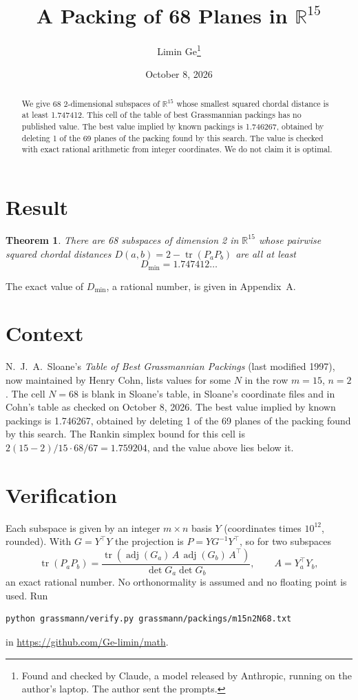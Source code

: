 \documentclass[11pt,a4paper]{article}
\title{A Packing of 68 Planes in $\mathbb{R}^{15}$}
\author{Limin Ge\thanks{Found and checked by Claude, a model released by Anthropic, running on the author's laptop. The author sent the prompts.}}
\date{October 8, 2026}
\newtheorem*{theorem}{Theorem}
\begin{document}
\maketitle
\begin{abstract}
We give 68 2-dimensional subspaces of $\mathbb{R}^{15}$ whose smallest squared chordal distance is at least 1.747412. This cell of the table of best Grassmannian packings has no published value. The best value implied by known packings is 1.746267, obtained by deleting 1 of the 69 planes of the packing found by this search. The value is checked with exact rational arithmetic from integer coordinates. We do not claim it is optimal.
\end{abstract}

\section{Result}
\begin{theorem}
There are 68 subspaces of dimension 2 in $\mathbb{R}^{15}$ whose pairwise squared chordal distances $D(a,b) = 2 - \operatorname{tr}(P_aP_b)$ are all at least
\[ D_{\min} = 1.747412\ldots \]
\end{theorem}
The exact value of $D_{\min}$, a rational number, is given in Appendix~A.


\section{Context}
N.~J.~A.~Sloane's \emph{Table of Best Grassmannian Packings} (last modified 1997), now maintained by Henry Cohn, lists values for some $N$ in the row $m=15$, $n=2$. The cell $N=68$ is blank in Sloane's table, in Sloane's coordinate files and in Cohn's table as checked on October 8, 2026. The best value implied by known packings is 1.746267, obtained by deleting 1 of the 69 planes of the packing found by this search. The Rankin simplex bound for this cell is $2(15-2)/15\cdot 68/67 = 1.759204$, and the value above lies below it.


\section{Verification}
Each subspace is given by an integer $m\times n$ basis $Y$ (coordinates times $10^{12}$, rounded). With $G=Y^\top Y$ the projection is $P=YG^{-1}Y^\top$, so for two subspaces
\[ \operatorname{tr}(P_aP_b)=\frac{\operatorname{tr}(\operatorname{adj}(G_a)\,A\,\operatorname{adj}(G_b)\,A^\top)}{\det G_a\det G_b},\qquad A=Y_a^\top Y_b, \]
an exact rational number. No orthonormality is assumed and no floating point is used. Run
\begin{verbatim}
python grassmann/verify.py grassmann/packings/m15n2N68.txt
\end{verbatim}
in \url{https://github.com/Ge-limin/math}.
\end{document}
